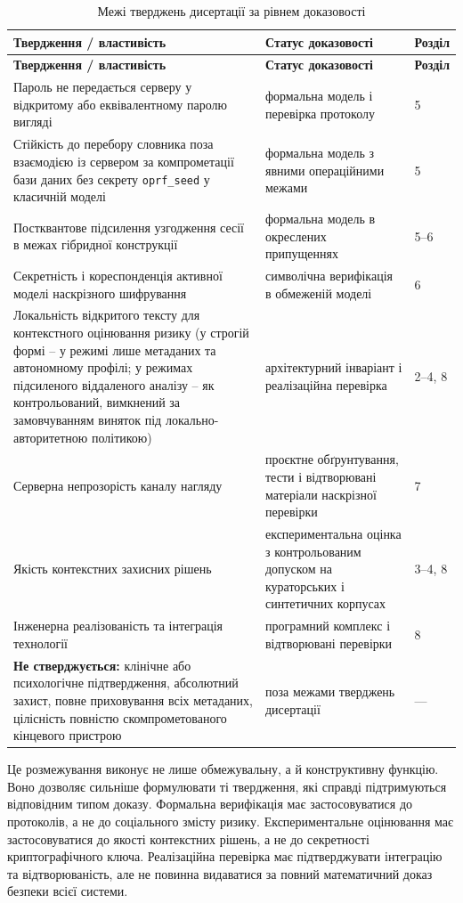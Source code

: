 \begin{longtable}{p{6.6cm} p{5.4cm} p{1.6cm}}
\caption{Межі тверджень дисертації за рівнем доказовості}
\label{tab:claim-boundary}\\
\toprule
\textbf{Твердження / властивість} & \textbf{Статус доказовості} & \textbf{Розділ} \\
\midrule
\endfirsthead
\toprule
\textbf{Твердження / властивість} & \textbf{Статус доказовості} & \textbf{Розділ} \\
\midrule
\endhead
Пароль не передається серверу у відкритому або еквівалентному паролю вигляді & формальна модель і перевірка протоколу & 5 \\
Стійкість до перебору словника поза взаємодією із сервером за компрометації бази даних без секрету \texttt{oprf\_seed} у класичній моделі & формальна модель з явними операційними межами & 5 \\
Постквантове підсилення узгодження сесії в межах гібридної конструкції & формальна модель в окреслених припущеннях & 5--6 \\
Секретність і кореспонденція активної моделі наскрізного шифрування & символічна верифікація в обмеженій моделі & 6 \\
Локальність відкритого тексту для контекстного оцінювання ризику (у строгій формі -- у режимі лише метаданих та автономному профілі; у режимах підсиленого віддаленого аналізу -- як контрольований, вимкнений за замовчуванням виняток під локально-авторитетною політикою) & архітектурний інваріант і реалізаційна перевірка & 2--4, 8 \\
Серверна непрозорість каналу нагляду & проєктне обґрунтування, тести і відтворювані матеріали наскрізної перевірки & 7 \\
Якість контекстних захисних рішень & експериментальна оцінка з контрольованим допуском на кураторських і синтетичних корпусах & 3--4, 8 \\
Інженерна реалізованість та інтеграція технології & програмний комплекс і відтворювані перевірки & 8 \\
\textbf{Не стверджується:} клінічне або психологічне підтвердження, абсолютний захист, повне приховування всіх метаданих, цілісність повністю скомпрометованого кінцевого пристрою & поза межами тверджень дисертації & --- \\
\bottomrule
\end{longtable}

Це розмежування виконує не лише обмежувальну, а й конструктивну функцію. Воно дозволяє сильніше формулювати ті твердження, які справді підтримуються відповідним типом доказу. Формальна верифікація має застосовуватися до протоколів, а не до соціального змісту ризику. Експериментальне оцінювання має застосовуватися до якості контекстних рішень, а не до секретності криптографічного ключа. Реалізаційна перевірка має підтверджувати інтеграцію та відтворюваність, але не повинна видаватися за повний математичний доказ безпеки всієї системи.

